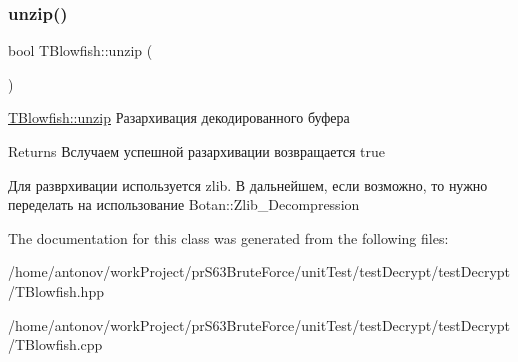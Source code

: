 \subsubsection{\texorpdfstring{unzip()}{unzip()}}
{\footnotesize\ttfamily bool T\+Blowfish\+::unzip (\begin{DoxyParamCaption}{ }\end{DoxyParamCaption})}



\hyperlink{classunit_test_1_1_t_blowfish_a17896279118b13a237ab31c1cb82da26}{T\+Blowfish\+::unzip} Разархивация декодированного буфера 

\begin{DoxyReturn}{Returns}
Вслучаем успешной разархивации возвращается true
\end{DoxyReturn}
Для разврхивации используется zlib. В дальнейшем, если возможно, то нужно переделать на использование Botan\+::\+Zlib\+\_\+\+Decompression 

The documentation for this class was generated from the following files\+:\begin{DoxyCompactItemize}
\item 
/home/antonov/work\+Project/pr\+S63\+Brute\+Force/unit\+Test/test\+Decrypt/test\+Decrypt/T\+Blowfish.\+hpp\item 
/home/antonov/work\+Project/pr\+S63\+Brute\+Force/unit\+Test/test\+Decrypt/test\+Decrypt/T\+Blowfish.\+cpp\end{DoxyCompactItemize}

